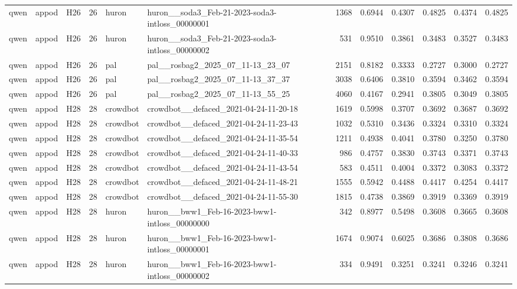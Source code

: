 \begin{table}[tbp]
\begin{tabular}{lllrllrrrrrr}
qwen & appod & H26 & 26 & huron & huron\_\_soda3\_Feb-21-2023-soda3-intloss\_00000001 & 1368 & 0.6944 & 0.4307 & 0.4825 & 0.4374 & 0.4825 \\
qwen & appod & H26 & 26 & huron & huron\_\_soda3\_Feb-21-2023-soda3-intloss\_00000002 & 531 & 0.9510 & 0.3861 & 0.3483 & 0.3527 & 0.3483 \\
qwen & appod & H26 & 26 & pal & pal\_\_rosbag2\_2025\_07\_11-13\_23\_07 & 2151 & 0.8182 & 0.3333 & 0.2727 & 0.3000 & 0.2727 \\
qwen & appod & H26 & 26 & pal & pal\_\_rosbag2\_2025\_07\_11-13\_37\_37 & 3038 & 0.6406 & 0.3810 & 0.3594 & 0.3462 & 0.3594 \\
qwen & appod & H26 & 26 & pal & pal\_\_rosbag2\_2025\_07\_11-13\_55\_25 & 4060 & 0.4167 & 0.2941 & 0.3805 & 0.3049 & 0.3805 \\
qwen & appod & H28 & 28 & crowdbot & crowdbot\_\_defaced\_2021-04-24-11-20-18 & 1619 & 0.5998 & 0.3707 & 0.3692 & 0.3687 & 0.3692 \\
qwen & appod & H28 & 28 & crowdbot & crowdbot\_\_defaced\_2021-04-24-11-23-43 & 1032 & 0.5310 & 0.3436 & 0.3324 & 0.3310 & 0.3324 \\
qwen & appod & H28 & 28 & crowdbot & crowdbot\_\_defaced\_2021-04-24-11-35-54 & 1211 & 0.4938 & 0.4041 & 0.3780 & 0.3250 & 0.3780 \\
qwen & appod & H28 & 28 & crowdbot & crowdbot\_\_defaced\_2021-04-24-11-40-33 & 986 & 0.4757 & 0.3830 & 0.3743 & 0.3371 & 0.3743 \\
qwen & appod & H28 & 28 & crowdbot & crowdbot\_\_defaced\_2021-04-24-11-43-54 & 583 & 0.4511 & 0.4004 & 0.3372 & 0.3083 & 0.3372 \\
qwen & appod & H28 & 28 & crowdbot & crowdbot\_\_defaced\_2021-04-24-11-48-21 & 1555 & 0.5942 & 0.4488 & 0.4417 & 0.4254 & 0.4417 \\
qwen & appod & H28 & 28 & crowdbot & crowdbot\_\_defaced\_2021-04-24-11-55-30 & 1815 & 0.4738 & 0.3869 & 0.3919 & 0.3369 & 0.3919 \\
qwen & appod & H28 & 28 & huron & huron\_\_bww1\_Feb-16-2023-bww1-intloss\_00000000 & 342 & 0.8977 & 0.5498 & 0.3608 & 0.3665 & 0.3608 \\
qwen & appod & H28 & 28 & huron & huron\_\_bww1\_Feb-16-2023-bww1-intloss\_00000001 & 1674 & 0.9074 & 0.6025 & 0.3686 & 0.3808 & 0.3686 \\
qwen & appod & H28 & 28 & huron & huron\_\_bww1\_Feb-16-2023-bww1-intloss\_00000002 & 334 & 0.9491 & 0.3251 & 0.3241 & 0.3246 & 0.3241 \\

\end{tabular}
\end{table}
